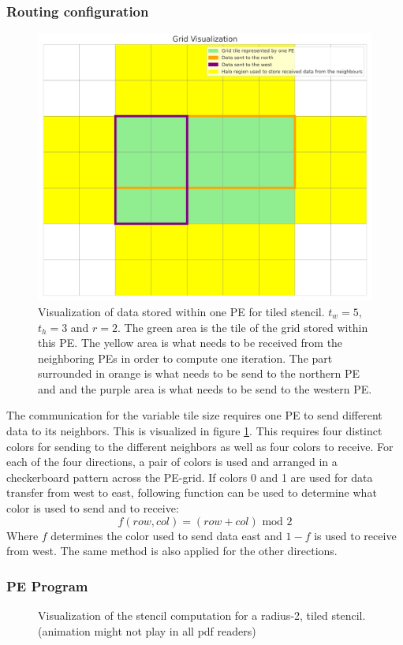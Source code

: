 \documentclass{article}
\newcommand{\m}{\text{ mod }}
\begin{document}
\subsubsection{Routing configuration}
\begin{figure}
    \centering
    \includegraphics[width=0.5\linewidth]{plots/grid_visualization.png}
    \caption{Visualization of data stored within one PE for tiled stencil. $t_w=5$, $t_h=3$ and $r=2$. The green area is the tile of the grid stored within this PE. The yellow area is what needs to be received from the neighboring PEs in order to compute one iteration. The part surrounded in orange is what needs to be send to the northern PE and and the purple area is what needs to be send to the western PE.}
    \label{fig:grid_visualization}
\end{figure}
The communication for the variable tile size requires one PE to send different data to its neighbors. This is visualized in figure \ref{fig:grid_visualization}. This requires four distinct colors for sending to the different neighbors as well as four colors to receive. For each of the four directions, a pair of colors is used and arranged in a checkerboard pattern across the PE-grid.
If colors 0 and 1 are used for data transfer from west to east, following function can be used to determine what color is used to send and to receive:
\begin{equation}
    \label{eq:tiled_coloring_function}
    f(row, col)=(row+col)\m2
\end{equation}
Where $f$ determines the color used to send data east and $1-f$ is used to receive from west. The same method is also applied for the other directions.
\subsubsection{PE Program}

\begin{figure}
    \centering
    \caption{Visualization of the stencil computation for a radius-2, tiled stencil. (animation might not play in all pdf readers)}
    \label{fig:stencil_algorithm_animation}
\end{figure}
\end{document}
